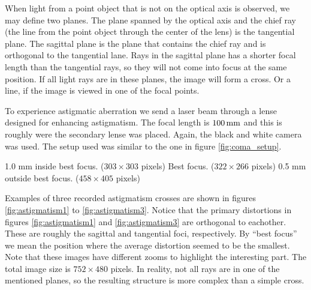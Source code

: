 When light from a point object that is not on the optical axis is observed, we
may define two planes. The plane spanned by the optical axis and the chief ray
(the line from the point object through the center of the lens) is the
tangential plane. The sagittal plane is the plane that contains the chief ray
and is orthogonal to the tangential lane. Rays in the sagittal plane has a
shorter focal length than the tangential rays, so they will not come into focus
at the same position. If all light rays are in these planes, the image will form
a cross. Or a line, if the image is viewed in one of the focal points.

To experience astigmatic aberration we send a laser beam through a lense
designed for enhancing astigmatism. The focal length is $100 \, \textrm{mm}$ and this is
roughly were the secondary lense was placed. Again, the black and white camera
was used. The setup used was similar to the one in figure \vref{fig:coma_setup}.

      {1.0 mm inside best focus. ($303 \times 303$ pixels)}
      {Best focus. ($322 \times 266$ pixels)}
      {0.5 mm outside best focus. ($458 \times 405$ pixels)}

Examples of three recorded astigmatism crosses are shown in figures
\ref{fig:astigmatism1} to \vref{fig:astigmatism3}. Notice that the primary
distortions in figures \ref{fig:astigmatism1} and \ref{fig:astigmatism3} are
orthogonal to eachother. These are roughly the sagittal and tangential foci,
respectively. By ``best focus'' we mean the position where the average
distortion seemed to be the smallest. Note that these images have different
zooms
to highlight the interesting part. The total image size is $752 \times 480$
pixels. In reality, not all rays are in one of the mentioned planes, so the
resulting structure is more complex than a simple cross.

